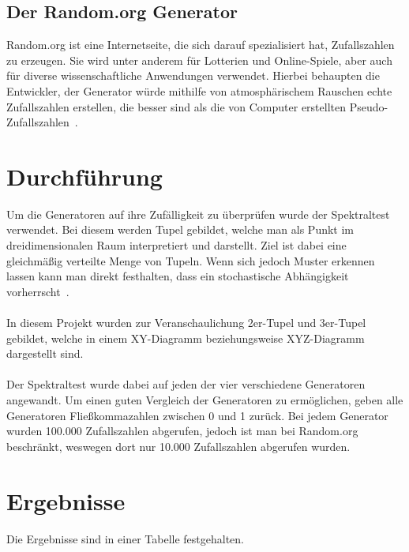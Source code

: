 \documentclass[12pt]{article}
\begin{document}
    \vfill

    \subsection{Der Random.org Generator}\label{subsec:der-random.org-generator}
    Random.org ist eine Internetseite, die sich darauf spezialisiert hat, Zufallszahlen zu erzeugen.
    Sie wird unter anderem für Lotterien und Online-Spiele, aber auch für diverse wissenschaftliche
    Anwendungen verwendet.
    Hierbei behaupten die Entwickler, der Generator würde mithilfe von atmosphärischem
    Rauschen echte Zufallszahlen erstellen, die besser sind als die von Computer erstellten Pseudo-Zufallszahlen~\cite{random-org}.

    \vfill

    \section{Durchführung}\label{sec:Durchfuehrung}
    Um die Generatoren auf ihre Zufälligkeit zu überprüfen wurde der Spektraltest verwendet.
    Bei diesem werden Tupel gebildet, welche man als Punkt im dreidimensionalen Raum interpretiert und darstellt.
    Ziel ist dabei eine gleichmäßig verteilte Menge von Tupeln.
    Wenn sich jedoch Muster erkennen lassen kann man direkt festhalten, dass ein stochastische Abhängigkeit vorherrscht~\cite{spektraltest}.
    \\ \\
    In diesem Projekt wurden zur Veranschaulichung 2er-Tupel und 3er-Tupel gebildet,
    welche in einem XY-Diagramm beziehungsweise XYZ-Diagramm dargestellt sind.
    \\ \\
    Der Spektraltest wurde dabei auf jeden der vier verschiedene Generatoren angewandt.
    Um einen guten Vergleich der Generatoren zu ermöglichen, geben alle Generatoren Fließkommazahlen zwischen 0 und 1 zurück.
    Bei jedem Generator wurden 100.000 Zufallszahlen abgerufen, jedoch ist man bei Random.org beschränkt,
    weswegen dort nur 10.000 Zufallszahlen abgerufen wurden.

    \vfill

    \section{Ergebnisse}\label{sec:Ergebnisse}
    Die Ergebnisse sind in einer Tabelle festgehalten.

\end{document}
